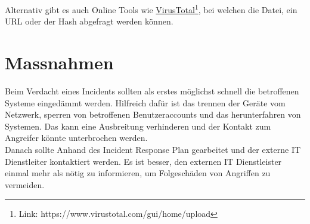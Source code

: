 Alternativ gibt es auch Online Tools wie \href{https://www.virustotal.com/gui/home/upload}{VirusTotal}\footnote{Link: https://www.virustotal.com/gui/home/upload}, bei welchen die Datei, ein URL oder der Hash abgefragt werden können.

\section{Massnahmen}
Beim Verdacht eines Incidents sollten als erstes möglichst schnell die betroffenen Systeme eingedämmt werden. 
Hilfreich dafür ist das trennen der Geräte vom Netzwerk, sperren von betroffenen Benutzeraccounts und das herunterfahren von Systemen.
Das kann eine Ausbreitung verhinderen und der Kontakt zum Angreifer könnte unterbrochen werden.\\

Danach sollte Anhand des Incident Response Plan gearbeitet und der externe IT Dienstleiter kontaktiert werden.
Es ist besser, den externen IT Dienstleister einmal mehr als nötig zu informieren, um Folgeschäden von Angriffen zu vermeiden. 

